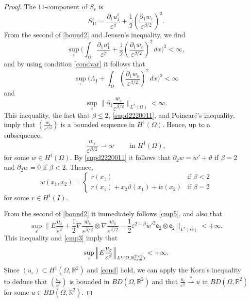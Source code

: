 \documentclass[a4, 11pt, reqno, final]{amsart}
\newcommand{\bbR}{\mathbb{R}}
\newcommand\e{\varepsilon}
\newcommand\weakstar{\stackrel{\ast }{\rightharpoonup}}  %
\newcommand\weak{\rightharpoonup} %
\theoremstyle{plain}%
\DeclareMathOperator{\Sym}{\bbR^{2\times 2}_{\rm sym}}
\begin{document}
\begin{proof}
		The $11$-component of $S_\e$ is
		$$
		S^\e_{11}=\frac{\partial_1 u^\e_1}{\e^\beta}+\frac 12 (\frac{\partial_1 w_\e}{\e^{\beta/2}})^2.
		$$
		From the second of \eqref{bound2} and  Jensen's inequality, we find
		$$
		\sup_\e \Big(\int_\Omega \frac{\partial_1 u^\e_1}{\e^\beta}+\frac 12 (\frac{\partial_1 w_\e}{\e^{\beta/2}})^2\, dx\Big)^2 < \infty,
		$$
		and by using condition \eqref{condvar} it follows that
		$$ \sup_\e \Big(\Lambda_1 + \int_\Omega (\frac{\partial_1 w_\e}{\e^{\beta/2}})^2 \, dx\Big)^2 < \infty$$
		and
		\begin{equation} \label{supd1222}
			\sup_{\e} \|{\partial_1 \frac{w_\e}{\e^{\beta/2}}}\|_{L^2(\Omega)} <\infty.
		\end{equation}
		This inequality, the fact that  $\beta\le 2$,  \eqref{supd2220011}, and Poincaré's inequality,
		imply that $(\frac{w_\e}{\e^{\beta/2}})$ is a bounded sequence in $H^1(\Omega)$. Hence, up to a subsequence,
		$$ \frac{w_\e}{\e^{\beta/2}} \weak w \qquad \text{ in } H^1(\Omega),
		$$
		for some  $w\in H^1(\Omega)$. By \eqref{supd2220011} it follows that $\partial_2 w=\mathring{w}'+\vartheta$ if $\beta=2$ and
		$\partial_2 w=0$ if $\beta<2$. Thence,
		$$
		w(x_1,x_2)=\begin{cases}
			r(x_1) & \text{if }\beta <2\\
			r(x_1)+x_2\vartheta(x_1)+\mathring{w}(x_2) & \text{if }\beta =2
		\end{cases}
		$$
		for some $r \in H^1(I)$.

		From the second of \eqref{bound2} it immediately follows \eqref{cmp5}, and also that
		$$ \sup_\e\Big\|E \frac{u_\e}{\e^\beta} + \frac12 \nabla \frac{w_\e}{\e^{\beta/2}} \otimes \nabla \frac{w_\e}{\e^{\beta/2}} -\frac12 \e^{2-\beta}\mathring{w}'^2 \mathsf{e}_2 \otimes \mathsf{e}_2\Big\|_{L^2(\Omega)} < +\infty.$$
		This inequality and  \eqref{cmp3} imply  that
		$$ \sup_\e \Big\|E\frac{u_\e}{\e^\beta}\Big\|_{L^1(\Omega,\Sym)} < +\infty.$$
		Since $(u_\e) \subset H^1(\Omega, \bbR^2)$ and \eqref{cond} hold,  we can apply the Korn's inequality \cite[Sec. 2.4]{Temam1987} to deduce that
		$(\frac{u_\e}{\e^\beta})$ is bounded in $BD(\Omega, \bbR^2)$ and that $\frac{u_\e}{\e^\beta} \weakstar u$ in $BD(\Omega, \bbR^2)$ for some $u \in BD(\Omega, \bbR^2)$.


\end{proof}
\end{document}
